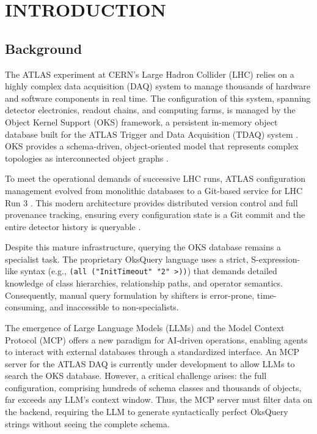 \documentclass[12pt, a4paper]{report}
\begin{document}
\chapter{INTRODUCTION}

\section{Background}

The ATLAS experiment at CERN's Large Hadron Collider (LHC) relies on a highly complex data acquisition (DAQ) system to manage thousands of hardware and software components in real time. The configuration of this system, spanning detector electronics, readout chains, and computing farms, is managed by the Object Kernel Support (OKS) framework, a persistent in-memory object database built for the ATLAS Trigger and Data Acquisition (TDAQ) system \cite{oks_paper}. OKS provides a schema-driven, object-oriented model that represents complex topologies as interconnected object graphs \cite{oks_paper}.

To meet the operational demands of successive LHC runs, ATLAS configuration management evolved from monolithic databases \cite{alexandrov2007} to a Git-based service for LHC Run 3 \cite{atlas_git}. This modern architecture provides distributed version control and full provenance tracking, ensuring every configuration state is a Git commit and the entire detector history is queryable \cite{atlas_git}.

Despite this mature infrastructure, querying the OKS database remains a specialist task. The proprietary OksQuery language uses a strict, S-expression-like syntax (e.g., \texttt{(all ("InitTimeout" "2" >))}) that demands detailed knowledge of class hierarchies, relationship paths, and operator semantics. Consequently, manual query formulation by shifters is error-prone, time-consuming, and inaccessible to non-specialists.

The emergence of Large Language Models (LLMs) and the Model Context Protocol (MCP) offers a new paradigm for AI-driven operations, enabling agents to interact with external databases through a standardized interface. An MCP server for the ATLAS DAQ is currently under development to allow LLMs to search the OKS database. However, a critical challenge arises: the full configuration, comprising hundreds of schema classes and thousands of objects, far exceeds any LLM's context window. Thus, the MCP server must filter data on the backend, requiring the LLM to generate syntactically perfect OksQuery strings without seeing the complete schema.
\end{document}
